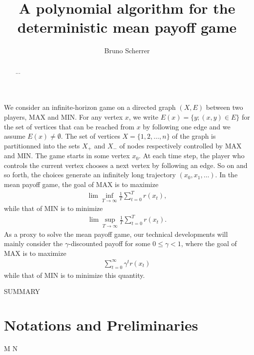 \documentclass{article}
\title{A polynomial algorithm for the deterministic mean payoff game}
\author{Bruno Scherrer}
\begin{document}
\maketitle

\begin{abstract}
...
\end{abstract}
  
We consider an infinite-horizon game on a directed graph $(X,E)$ between two players, MAX and MIN. For any vertex $x$, we write $E(x)=\{y;(x,y) \in E\}$ for the set of vertices that can be reached from $x$ by following one edge and we assume $E(x)\neq\emptyset$.  The set of vertices $X=\{1,2,\dots,n\}$ of the graph is partitionned into the sets $X_+$ and $X_-$ of nodes respectively controlled by MAX and MIN. The game starts in some vertex $x_0$. At each time step, the player who controls the current vertex chooses a next vertex by following an edge. So on and so forth, the choices generate an infinitely long trajectory $(x_0,x_1,\dots)$. In the mean payoff game, the goal of MAX is to maximize
\begin{align}
\lim\inf_{T \to \infty} \frac 1 T \sum_{t=0}^{T}  r(x_t),
\end{align}
while that of MIN is to minimize
\begin{align}
\lim\sup_{T \to \infty} \frac 1 T \sum_{t=0}^{T}  r(x_t).
\end{align}
As a proxy to solve the mean payoff game, our technical developments will mainly consider the $\gamma$-discounted payoff for some $0\le\gamma<1$, where the goal of MAX is to maximize
\begin{align}
\sum_{t=0}^{\infty} \gamma^t r(x_t)
\end{align}
while that of MIN is to minimize this quantity.

SUMMARY

\section{Notations and Preliminaries}

M N
\end{document}
